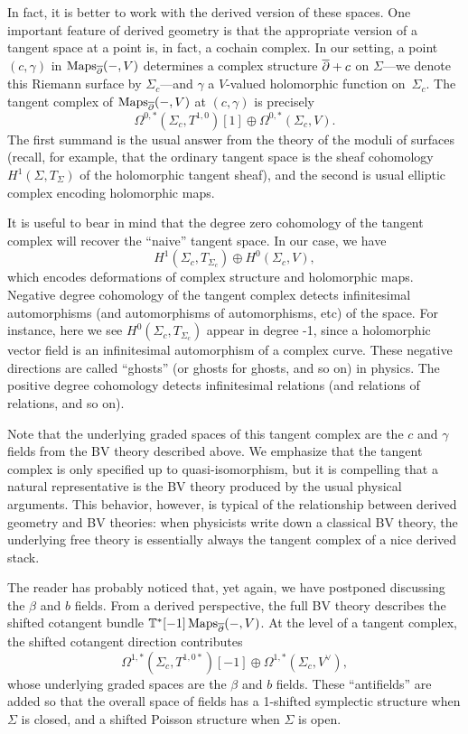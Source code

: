 In fact, it is better to work with the derived version of these spaces.
One important feature of derived geometry is that the appropriate version of a tangent space at a point is, in fact, a cochain complex.
In our setting, a point $(c,\gamma)$ in $\operatorname{Maps}_{\overline{\partial}}(-,V)$ determines a complex structure $\overline{\partial} + c$ on $\Sigma$---we denote this Riemann surface by $\Sigma_c$---and $\gamma$ a $V$-valued holomorphic function on~$\Sigma_c$.
The tangent complex of $\operatorname{Maps}_{\overline{\partial}}(-,V)$ at $(c,\gamma)$ is precisely 
\[
\Omega^{0,*}(\Sigma_c,T^{1,0})[1] \oplus \Omega^{0,*}(\Sigma_c,V).
\]
The first summand is the usual answer from the theory of the moduli of surfaces 
(recall, for example, that the ordinary tangent space is the sheaf cohomology $H^1(\Sigma,T_\Sigma)$ of the holomorphic tangent sheaf),
and the second is usual elliptic complex encoding holomorphic maps.

\begin{rmk}
It is useful to bear in mind that the degree zero cohomology of the tangent complex will recover the ``naive'' tangent space. 
In our case, we have 
\[
H^1(\Sigma_c,T_{\Sigma_c}) \oplus H^0(\Sigma_c,V),
\]
which encodes deformations of complex structure and holomorphic maps.
Negative degree cohomology of the tangent complex detects infinitesimal automorphisms (and automorphisms of automorphisms, etc) of the space.
For instance, here we see $H^0(\Sigma_c,T_{\Sigma_c})$ appear in degree -1, 
since a holomorphic vector field is an infinitesimal automorphism of a complex curve.
These negative directions are called ``ghosts'' (or ghosts for ghosts, and so on) in physics.
The positive degree cohomology detects infinitesimal relations (and relations of relations, and so on).
\end{rmk}

Note that the underlying graded spaces of this tangent complex are the $c$ and $\gamma$ fields from the BV theory described above.
We emphasize that the tangent complex is only specified up to quasi-isomorphism,
but it is compelling that a natural representative is the BV theory produced by the usual physical arguments.
This behavior, however, is typical of the relationship between derived geometry and BV theories:
when physicists write down a classical BV theory, 
the underlying free theory is essentially always the tangent complex of a nice derived stack.

The reader has probably noticed that, yet again, we have postponed discussing the $\beta$ and $b$ fields.
From a derived perspective, the full BV theory describes the shifted cotangent bundle $\mathbb T^*[-1]\operatorname{Maps}_{\overline{\partial}}(-,V)$.
At the level of a tangent complex, the shifted cotangent direction contributes
\[
\Omega^{1,*}(\Sigma_c,T^{1,0*})[-1] \oplus \Omega^{1,*}(\Sigma_c,V^\vee),
\]
whose underlying graded spaces are the $\beta$ and $b$ fields.
These ``antifields'' are added so that the overall space of fields has a 1-shifted symplectic structure  when $\Sigma$ is closed, and a shifted Poisson structure when $\Sigma$ is open.

